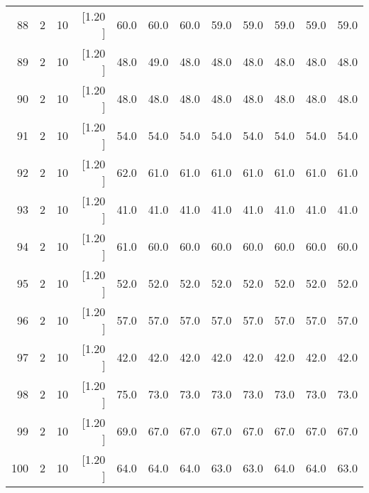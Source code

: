 \documentclass[12pt,a4paper]{article}
\begin{document}
\begin{center}
{\begin{tabular}{r r r r r r r r r r r r}
  88&  2& 10&[1.20      ]&    60.0&    60.0&    60.0&    59.0&    59.0&    59.0&    59.0&    59.0\\[-0.02in]
  89&  2& 10&[1.20      ]&    48.0&    49.0&    48.0&    48.0&    48.0&    48.0&    48.0&    48.0\\[-0.02in]
  90&  2& 10&[1.20      ]&    48.0&    48.0&    48.0&    48.0&    48.0&    48.0&    48.0&    48.0\\[-0.02in]
  91&  2& 10&[1.20      ]&    54.0&    54.0&    54.0&    54.0&    54.0&    54.0&    54.0&    54.0\\[-0.02in]
  92&  2& 10&[1.20      ]&    62.0&    61.0&    61.0&    61.0&    61.0&    61.0&    61.0&    61.0\\[-0.02in]
  93&  2& 10&[1.20      ]&    41.0&    41.0&    41.0&    41.0&    41.0&    41.0&    41.0&    41.0\\[-0.02in]
  94&  2& 10&[1.20      ]&    61.0&    60.0&    60.0&    60.0&    60.0&    60.0&    60.0&    60.0\\[-0.02in]
  95&  2& 10&[1.20      ]&    52.0&    52.0&    52.0&    52.0&    52.0&    52.0&    52.0&    52.0\\[-0.02in]
  96&  2& 10&[1.20      ]&    57.0&    57.0&    57.0&    57.0&    57.0&    57.0&    57.0&    57.0\\[-0.02in]
  97&  2& 10&[1.20      ]&    42.0&    42.0&    42.0&    42.0&    42.0&    42.0&    42.0&    42.0\\[-0.02in]
  98&  2& 10&[1.20      ]&    75.0&    73.0&    73.0&    73.0&    73.0&    73.0&    73.0&    73.0\\[-0.02in]
  99&  2& 10&[1.20      ]&    69.0&    67.0&    67.0&    67.0&    67.0&    67.0&    67.0&    67.0\\[-0.02in]
 100&  2& 10&[1.20      ]&    64.0&    64.0&    64.0&    63.0&    63.0&    64.0&    64.0&    63.0\\[-0.02in]

\hline
\end{tabular}}
\end{center}
\end{document}
